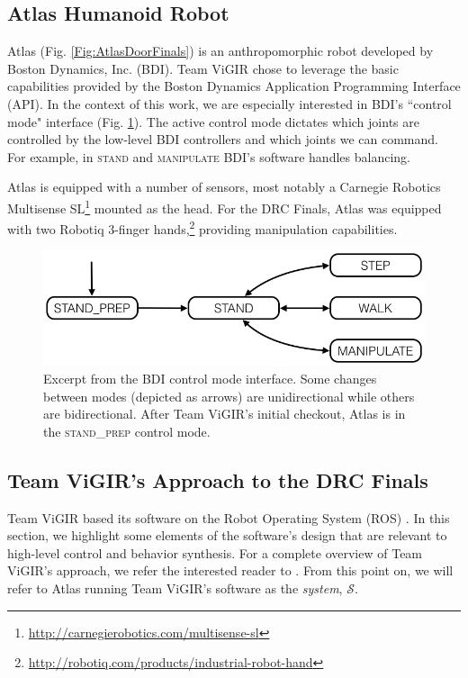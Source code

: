 
\subsection{Atlas Humanoid Robot}

Atlas (Fig. \ref{Fig:AtlasDoorFinals}) is an anthropomorphic robot developed by Boston Dynamics, Inc. (BDI). 
Team ViGIR chose to leverage the basic capabilities provided by the Boston Dynamics Application Programming Interface (API).
In the context of this work, we are especially interested in BDI's ``control mode" interface (Fig. \ref{Fig:ControlModeTS}).
The active control mode dictates which joints are controlled by the low-level BDI controllers and which joints we can command.
For example, in \textsc{stand} and \textsc{manipulate} BDI's software handles balancing.

Atlas is equipped with a number of sensors, most notably a Carnegie Robotics Multisense SL\footnote{\scriptsize{\url{http://carnegierobotics.com/multisense-sl}}} mounted as the head.
For the DRC Finals, Atlas was equipped with two Robotiq 3-finger hands,\footnote{\scriptsize{\url{http://robotiq.com/products/industrial-robot-hand}}} providing manipulation capabilities.

\begin{figure}[t]
\centering
\includegraphics[width=0.99\columnwidth,clip]{./img/control_modes_ts.png}
\caption{Excerpt from the BDI control mode interface.
Some changes between modes (depicted as arrows) are unidirectional while others are bidirectional.
After Team ViGIR's initial checkout, Atlas is in the \textsc{stand\_prep} control mode.
}
\label{Fig:ControlModeTS}
\end{figure}

\subsection{Team ViGIR's Approach to the DRC Finals}\label{S:TeamViGIR}

Team ViGIR based its software on the Robot Operating System (ROS) \cite{ROS2009ICRA, ROS}.
In this section, we highlight some elements of the software's design that are relevant to high-level control and behavior synthesis.
For a complete overview of Team ViGIR's approach, we refer the interested reader to \cite{TeamViGIR2014JFR}.
From this point on, we will refer to Atlas running Team ViGIR's software as the \emph{system}, $\mathcal{S}$.

